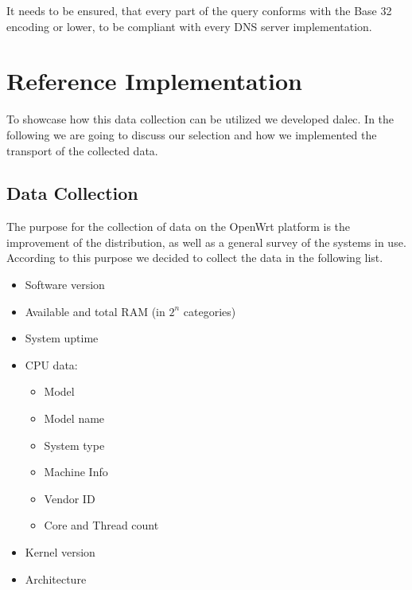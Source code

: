         It needs to be ensured, that every part of the query conforms with the Base 32 encoding or lower, to be compliant with every DNS server implementation\cite{mockapetris_domain_1987}.

\newpage


\section{Reference Implementation}
\label{sec:software_design:ref_impl}
    To showcase how this data collection can be utilized we developed dalec\cite{venz_ikstreamdalec_2021}.
    In the following we are going to discuss our selection and how we implemented the transport of the collected data.
%
\subsection{Data Collection}
    The purpose for the collection of data on the OpenWrt platform is the improvement of the distribution, as well as a general survey of the systems in use. According to this purpose we decided to collect the data in the following list. 
    \begin{itemize}
        \item Software version
        \item Available and total RAM (in $2^n$ categories)
        \item System uptime
        \item CPU data:
        \begin{itemize}
            \item Model
            \item Model name
            \item System type
            \item Machine Info
            \item Vendor ID
            \item Core and Thread count
        \end{itemize}
        \item Kernel version
        \item Architecture
    \end{itemize}
    
